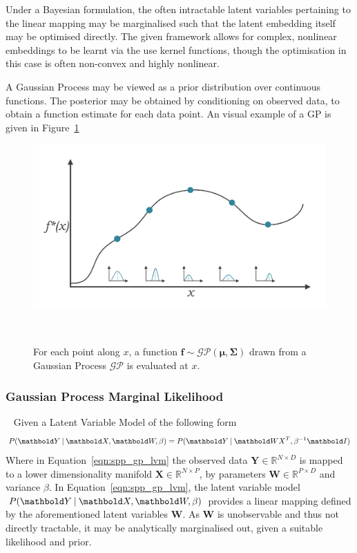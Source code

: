 Under a Bayesian formulation, the often intractable latent variables pertaining to the linear 
mapping may be marginalised such that the latent embedding itself may be optimised directly. The 
given framework allows for complex, nonlinear embeddings to be learnt via the use kernel functions, 
though the optimisation in this case is often non-convex and highly nonlinear.

A Gaussian Process may be viewed as a prior distribution over continuous functions. The posterior 
may be obtained by conditioning on observed data, to obtain a function estimate for each data point.
An visual example of a GP is given in Figure~\ref{figure:gp_func_dist}
\begin{figure}[!htbp]
  \centering
  \includegraphics[width=\linewidth]{figures/spp/gp.pdf}
  \caption[GP as a Distribution Over Functions]{For each point along \( x \), 
  a function \( \bm{f} \sim \mathcal{GP}(\bm{\mu}, \bm{\Sigma}) \) drawn from a Gaussian Process 
  \( \mathcal{GP} \) is evaluated at \( x \).}
~\label{figure:gp_func_dist}
\end{figure}

\subsubsection{Gaussian Process Marginal Likelihood}
~\label{subsubsec:spp_gp_marginal_likelihood}
Given a Latent Variable Model of the following form
\begin{equation}
  \label{eqn:spp_gp_lvm}
  P(\bm{Y} \given \bm{X}, \bm{W}, \beta) = P(\bm{Y} \given \bm{WX}^{T}, \beta^{-1}\bm{I})
\end{equation}
Where in Equation~\ref{eqn:spp_gp_lvm} the observed data \(\bm{Y} \in \mathbb{R}^{N \times D}\) 
is mapped to a lower dimensionality manifold \(\bm{X} \in \mathbb{R}^{N \times P}\), by parameters 
\(\bm{W} \in \mathbb{R}^{P \times D}\) and variance \( \beta \). In Equation~\ref{eqn:spp_gp_lvm}, 
the latent variable model \( P(\bm{Y} \given \bm{X}, \bm{W}, \beta) \) provides a linear mapping 
defined by the aforementioned latent variables \( \bm{W} \). As \( \bm{W} \) is unobservable and 
thus not directly tractable, it may be analytically marginalised out, given a suitable likelihood 
and prior.

